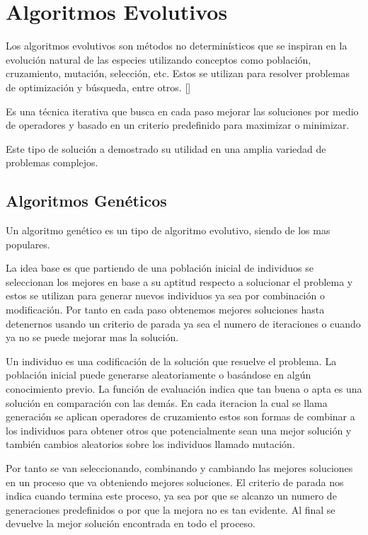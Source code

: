 \section{Algoritmos Evolutivos}
Los algoritmos evolutivos son métodos no determinísticos que se inspiran en la evolución natural de las especies utilizando conceptos como población, cruzamiento, mutación, selección, etc. Estos se utilizan para resolver problemas de optimización y búsqueda, entre otros. []

Es una técnica iterativa que busca en cada paso mejorar las soluciones por medio de operadores y basado en un criterio predefinido para maximizar o minimizar.

Este tipo de solución a demostrado su utilidad en una amplia variedad de problemas complejos.


\subsection{Algoritmos Genéticos}
Un algoritmo genético es un tipo de algoritmo evolutivo, siendo de los mas populares.

La idea base es que partiendo de una población inicial de individuos se seleccionan los mejores en base a su aptitud respecto a solucionar el problema y estos se utilizan para generar nuevos individuos ya sea por combinación o modificación. Por tanto en cada paso obtenemos mejores soluciones hasta detenernos usando un criterio de parada ya sea el numero de iteraciones o cuando ya no se puede mejorar mas la solución.

Un individuo es una codificación de la solución que resuelve el problema.
La población inicial puede generarse aleatoriamente o basándose en algún conocimiento previo.
La función de evaluación indica que tan buena o apta es una solución en comparación con las demás.
En cada iteracion la cual se llama generación se aplican operadores de cruzamiento estos son formas de combinar a los individuos para obtener otros que potencialmente sean una mejor solución y también cambios aleatorios sobre los individuos llamado mutación.

Por tanto se van seleccionando, combinando y cambiando las mejores soluciones en un proceso que va obteniendo mejores soluciones.
El criterio de parada nos indica cuando termina este proceso, ya sea por que se alcanzo un numero de generaciones predefinidos o por que la mejora no es tan evidente. Al final se devuelve la mejor solución encontrada en todo el proceso.


